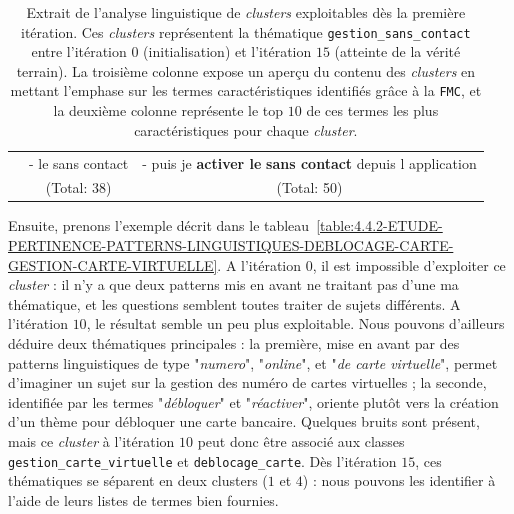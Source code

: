 \begin{table}[!htb]
\begin{center}
\begin{tabular}{|c|l|l|}
						& { \scriptsize - le sans contact }
						& { \scriptsize - puis je \textbf{activer le} \textbf{sans contact} depuis l application }
						\tabularnewline
						
						& \multicolumn{1}{c|}{
							\scriptsize (Total: 38)
						}
						& \multicolumn{1}{c|}{
							\scriptsize (Total: 50)
						}
						\tabularnewline
						\hline
					
				\end{tabular}
				\end{center}
				\caption{Extrait de l'analyse linguistique de \textit{clusters} exploitables dès la première itération.
				Ces \textit{clusters} représentent la thématique \texttt{gestion\_sans\_contact} entre l'itération $0$ (initialisation) et l'itération $15$ (atteinte de la vérité terrain).
				La troisième colonne expose un aperçu du contenu des \textit{clusters} en mettant l'emphase sur les termes caractéristiques identifiés grâce à la \texttt{FMC}, et la deuxième colonne représente le top $10$ de ces termes les plus caractéristiques pour chaque \textit{cluster}.
				}
				\label{table:4.4.2-ETUDE-PERTINENCE-PATTERNS-LINGUISTIQUES-GESTION-SANS-CONTACT}
			\end{table}
			
			Ensuite, prenons l'exemple décrit dans le tableau~\ref{table:4.4.2-ETUDE-PERTINENCE-PATTERNS-LINGUISTIQUES-DEBLOCAGE-CARTE-GESTION-CARTE-VIRTUELLE}.
			A l'itération $0$, il est impossible d'exploiter ce \textit{cluster} : il n'y a que deux patterns mis en avant ne traitant pas d'une ma thématique, et les questions semblent toutes traiter de sujets différents.
			A l'itération $10$, le résultat semble un peu plus exploitable.
			Nous pouvons d'ailleurs déduire deux thématiques principales : la première, mise en avant par des patterns linguistiques de type "\textit{numero}", "\textit{online}", et "\textit{de carte virtuelle}", permet d'imaginer un sujet sur la gestion des numéro de cartes virtuelles ; la seconde, identifiée par les termes "\textit{débloquer}" et "\textit{réactiver}", oriente plutôt vers la création d'un thème pour débloquer une carte bancaire.
			Quelques bruits sont présent, mais ce \textit{cluster} à l'itération $10$ peut donc être associé aux classes \texttt{gestion\_carte\_virtuelle} et \texttt{deblocage\_carte}.
			Dès l'itération $15$, ces thématiques se séparent en deux clusters ($1$ et $4$) : nous pouvons les identifier à l'aide de leurs listes de termes bien fournies.
			
